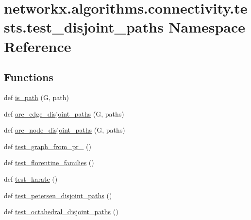 \hypertarget{namespacenetworkx_1_1algorithms_1_1connectivity_1_1tests_1_1test__disjoint__paths}{}\section{networkx.\+algorithms.\+connectivity.\+tests.\+test\+\_\+disjoint\+\_\+paths Namespace Reference}
\label{namespacenetworkx_1_1algorithms_1_1connectivity_1_1tests_1_1test__disjoint__paths}
\subsection*{Functions}
\begin{DoxyCompactItemize}
\item 
def \hyperlink{namespacenetworkx_1_1algorithms_1_1connectivity_1_1tests_1_1test__disjoint__paths_a5b898e2728f0012983c6d39efd0a6604}{is\+\_\+path} (G, path)
\item 
def \hyperlink{namespacenetworkx_1_1algorithms_1_1connectivity_1_1tests_1_1test__disjoint__paths_ae02699aaf576cd81baae44628671f4bf}{are\+\_\+edge\+\_\+disjoint\+\_\+paths} (G, paths)
\item 
def \hyperlink{namespacenetworkx_1_1algorithms_1_1connectivity_1_1tests_1_1test__disjoint__paths_ab9031637d3439db7a765a24350914ebd}{are\+\_\+node\+\_\+disjoint\+\_\+paths} (G, paths)
\item 
def \hyperlink{namespacenetworkx_1_1algorithms_1_1connectivity_1_1tests_1_1test__disjoint__paths_a02ec60b2b37f3854213eac6b3d59fc7b}{test\+\_\+graph\+\_\+from\+\_\+pr\+\_} ()
\item 
def \hyperlink{namespacenetworkx_1_1algorithms_1_1connectivity_1_1tests_1_1test__disjoint__paths_ac3389500656769dee90e1e016955dc96}{test\+\_\+florentine\+\_\+families} ()
\item 
def \hyperlink{namespacenetworkx_1_1algorithms_1_1connectivity_1_1tests_1_1test__disjoint__paths_a9e3ff07487e8e1f7eb776ef0ad8e2873}{test\+\_\+karate} ()
\item 
def \hyperlink{namespacenetworkx_1_1algorithms_1_1connectivity_1_1tests_1_1test__disjoint__paths_a5df328714aedd428dd7531a0a2a7e16e}{test\+\_\+petersen\+\_\+disjoint\+\_\+paths} ()
\item 
def \hyperlink{namespacenetworkx_1_1algorithms_1_1connectivity_1_1tests_1_1test__disjoint__paths_aec542464f12e4a56b7606ec1e1be8a8a}{test\+\_\+octahedral\+\_\+disjoint\+\_\+paths} ()

\end{DoxyCompactItemize}

